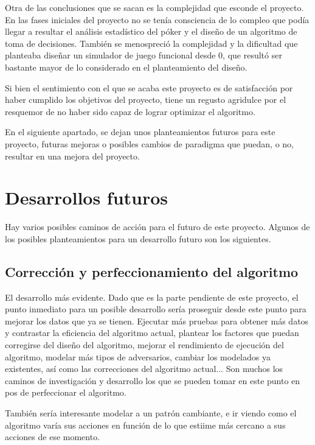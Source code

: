 Otra de las conclusiones que se sacan es la complejidad que esconde el proyecto. En las fases iniciales del proyecto no se tenía consciencia de lo compleo que podía llegar a resultar el análisis estadístico del póker y el diseño de un algoritmo de toma de decisiones. También se menospreció la complejidad y la dificultad que planteaba diseñar un simulador de juego funcional desde 0, que resultó ser bastante mayor de lo considerado en el planteamiento del diseño. 

Si bien el sentimiento con el que se acaba este proyecto es de satisfacción por haber cumplido los objetivos del proyecto, tiene un regusto agridulce por el resquemor de no haber sido capaz de lograr optimizar el algoritmo.

En el siguiente apartado, se dejan unos planteamientos futuros para este proyecto, futuras mejoras o posibles cambios de paradigma que puedan, o no, resultar en una mejora del proyecto.

\section{Desarrollos futuros}

Hay varios posibles caminos de acción para el futuro de este proyecto. Algunos de los posibles planteamientos para un desarrollo futuro son los siguientes.

\subsection{Corrección y perfeccionamiento del algoritmo}

El desarrollo más evidente. Dado que es la parte pendiente de este proyecto, el punto inmediato para un posible desarrollo sería proseguir desde este punto para mejorar los datos que ya se tienen. Ejecutar más pruebas para obtener más datos y contrastar la eficiencia del algoritmo actual, plantear los factores que puedan corregirse del diseño del algoritmo, mejorar el rendimiento de ejecución del algoritmo, modelar más tipos de adversarios, cambiar los modelados ya existentes, así como las correcciones del algoritmo actual... Son muchos los caminos de investigación y desarrollo los que se pueden tomar en este punto en pos de perfeccionar el algoritmo.

También sería interesante modelar a un patrón cambiante, e ir viendo como el algoritmo varía sus acciones en función de lo que estiime más cercano a sus acciones de ese momento.

